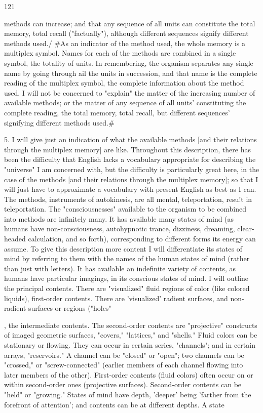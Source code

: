 \documentclass[10pt,twoside]{memoir}
\begin{document}
\begin{enumerate}
{{{{{{{{{{{{{{{121 


methods can increase; and that any sequence of all units can constitute the 
total memory, total recall ("factually"), although different sequences signify 
different methods used./ #As an indicator of the method used, the whole 
memory is a multiplex symbol. Names for each of the methods are combined 
in a single symbol, the totality of units. In remembering, the organism 
separates any single name by going through ail the units in succession, and 
that name is the complete reading of the multiplex symbol, the complete 
information about the method used. I will not be concerned to "explain" 
the matter of the increasing number of available methods; or the matter of 
any sequence of all units' constituting the complete reading, the total 
memory, total recall, but different sequences' signifying different methods 
used.# 

5. I will give just an indication of what the available methods [and 
their relations through the multiplex memory] are like. Throughout this 
description, there has been the difficulty that English lacks a vocabulary 
appropriate for describing the "universe" I am concerned with, but the 
difficulty is particularly great here, in the case of the methods [and their 
relations through the multiplex memory]; so that I will just have to 
approximate a vocabulary with present English as best as I can. The 
methods, instruments of autokinesis, are all mental, teleportation, resu!t in 
teleportation. The "consciousnesses" available to the organism to be 
combined into methods are infinitely many. It has available many states of 
mind (as humans have non-consciousness, autohypnotic trance, dizziness, 
dreaming, clear-headed calculation, and so forth), corresponding to different 
forms its energy can assume. To give this description more content I will 
differentiate its states of mind by referring to them with the names of the 
human states of mind (rather than just with letters). It has available an 
indefinite variety of contents, as humans have particular imagings, in its 
conscious states of mind. I will outline the principal contents. There are 
"visualized" fluid regions of color (like colored liquids), first-order contents. 
There are 'visualized' radient surfaces, and non-radient surfaces or regions 
("holes"}, the intermediate contents. The second-order contents are 
"projective" constructs of imaged geometric surfaces, "covers," "lattices," 
and "shells." Fluid colors can be stationary or flowing. They can occur in 
certain series, "channels"; and in certain arrays, "reservoirs." A channel can 
be "closed" or "open"; two channels can be "crossed," or 
"screw-connected" (earlier members of each channel flowing into later 
members of the other). First-order contents (fluid colors) often occur on or 
within second-order ones (projective surfaces). Second-order contents can be 
"held" or "growing." States of mind have depth, 'deeper' being 'farther from 
the forefront of attention'; and contents can be at different depths. A state 


}}}}}}}}}}}}}}
\end{enumerate}
\end{document}

